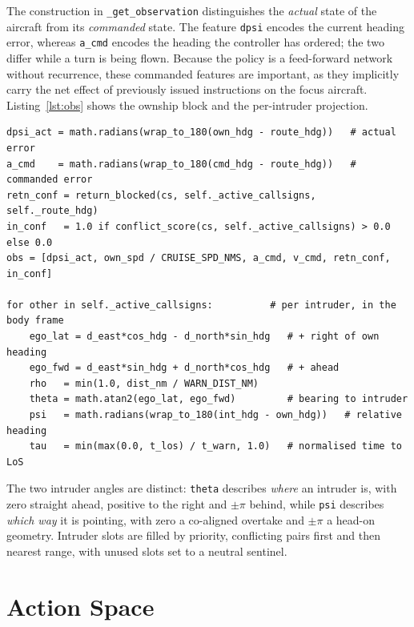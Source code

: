 The construction in \texttt{\_get\_observation} distinguishes the \emph{actual} state of the aircraft from its \emph{commanded} state. The feature \texttt{dpsi} encodes the current heading error, whereas \texttt{a\_cmd} encodes the heading the controller has ordered; the two differ while a turn is being flown. Because the policy is a feed-forward network without recurrence, these commanded features are important, as they implicitly carry the net effect of previously issued instructions on the focus aircraft. Listing~\ref{lst:obs} shows the ownship block and the per-intruder projection.

\begin{lstlisting}[caption={Ownship features and intruder projection (\texttt{env.py}, abridged).}, label={lst:obs}]
dpsi_act = math.radians(wrap_to_180(own_hdg - route_hdg))   # actual error
a_cmd    = math.radians(wrap_to_180(cmd_hdg - route_hdg))   # commanded error
retn_conf = return_blocked(cs, self._active_callsigns, self._route_hdg)
in_conf   = 1.0 if conflict_score(cs, self._active_callsigns) > 0.0 else 0.0
obs = [dpsi_act, own_spd / CRUISE_SPD_NMS, a_cmd, v_cmd, retn_conf, in_conf]

for other in self._active_callsigns:          # per intruder, in the body frame
    ego_lat = d_east*cos_hdg - d_north*sin_hdg   # + right of own heading
    ego_fwd = d_east*sin_hdg + d_north*cos_hdg   # + ahead
    rho   = min(1.0, dist_nm / WARN_DIST_NM)
    theta = math.atan2(ego_lat, ego_fwd)         # bearing to intruder
    psi   = math.radians(wrap_to_180(int_hdg - own_hdg))   # relative heading
    tau   = min(max(0.0, t_los) / t_warn, 1.0)   # normalised time to LoS
\end{lstlisting}

The two intruder angles are distinct: \texttt{theta} describes \emph{where} an intruder is, with zero straight ahead, positive to the right and $\pm\pi$ behind, while \texttt{psi} describes \emph{which way} it is pointing, with zero a co-aligned overtake and $\pm\pi$ a head-on geometry. Intruder slots are filled by priority, conflicting pairs first and then nearest range, with unused slots set to a neutral sentinel.


\section{Action Space}
\label{sec:method_act}

